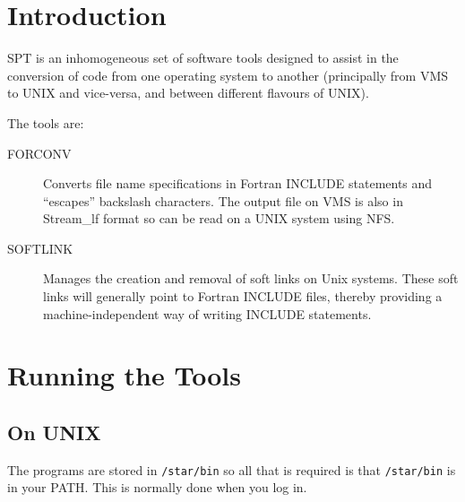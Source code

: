 \stardocabstract
 \newpage
 \begin{latexonly}
   \setlength{\parskip}{0mm}
   \latexonlytoc
   \setlength{\parskip}{\medskipamount}
   \markright{\stardocname}
 \end{latexonly}
\newpage
\renewcommand{\thepage}{\arabic{page}}
\setcounter{page}{1}

\section{Introduction}

SPT is an inhomogeneous set of
software tools designed to assist in the
conversion of code from one operating system to another (principally from
VMS to UNIX and vice-versa, and between different flavours of UNIX).

The tools are:
\begin{description}
\item[FORCONV] Converts file name specifications in Fortran INCLUDE statements
and ``escapes'' backslash characters. The output file on VMS is also in
Stream\_lf format so can be read on a UNIX system using NFS.
\item[SOFTLINK] Manages the creation and removal of soft links on Unix systems.
These soft links will generally point to Fortran INCLUDE files, thereby
providing a machine-independent way of writing INCLUDE statements.
\end{description}

\section{Running the Tools}

\subsection{On UNIX}

The programs are stored in {\tt /star/bin} so all that is required is
that {\tt /star/bin} is in your PATH. This is normally done when you log in.
